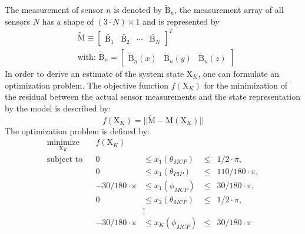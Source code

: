 The measurement of sensor $ n $ is denoted by $ \tilde{\mathrm{B}}_{n} $, the measurement array of all sensors $ N $ has a shape of $ (3 \cdot N) \times 1 $ and is represented by
\begin{equation}
\begin{aligned}
& \tilde{\mathrm{M}} \equiv \begin{bmatrix} \tilde{\mathrm{B}_{1}} & \tilde{\mathrm{B}_{2}} & \cdots & \tilde{\mathrm{B}_{N}} \end{bmatrix}^{T}\\[5pt]
& \text{with: }  \tilde{\mathrm{B}}_{n} = \begin{bmatrix} \tilde{\mathrm{B}}_{n}(x) & \tilde{\mathrm{B}}_{n}(y) & \tilde{\mathrm{B}}_{n}(z) \end{bmatrix}
\end{aligned}
\end{equation}
In order to derive an estimate of the system state $ \mathrm{X}_K $, one can formulate an optimization problem. The objective function $ f(\mathrm{X}_K) $ for the minimization of the residual between the actual sensor measurements and the state representation by the model is described by:
\begin{equation}
f(\mathrm{X}_K) = || \tilde{\mathrm{M}} - \mathrm{M}(\mathrm{X}_K) ||
\end{equation}
The optimization problem is defined by:
\begin{equation} \label{eq:minimization}
\begin{aligned}
\underset{\mathrm{X}_K}{\text{minimize}} & & f(\mathrm{X}_K) \\
\text{subject to} & & 0 & \leq {x}_1(\theta_{MCP}) & \leq & 1/2 \cdot \pi, \\
				  & & 0 & \leq {x}_1(\theta_{PIP}) & \leq & 110/180 \cdot \pi, \\
				  & & -30/180 \cdot \pi & \leq {x}_1(\phi_{MCP}) & \leq & 30/180 \cdot \pi, \\
				  & & 0 & \leq {x}_2(\theta_{MCP}) & \leq & 1/2 \cdot \pi, \\
				  & & & \vdots \\
				  & & -30/180 \cdot \pi & \leq {x}_K(\phi_{MCP}) & \leq & 30/180 \cdot \pi
\end{aligned}
\end{equation}
